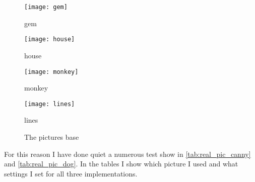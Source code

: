 \begin{figure}[H]
\centering
\begin{minipage}[t]{.49\textwidth}
\centering
\texttt{[image: gem]}
\addtocounter{figure}{-1}
\captionsetup{labelformat=empty}
\caption[]{gem}
\end{minipage}
\begin{minipage}[t]{.49\textwidth}
\centering
\texttt{[image: house]}
\addtocounter{figure}{-1}
\captionsetup{labelformat=empty}
\caption[]{house}
\end{minipage}
\begin{minipage}[t]{.49\textwidth}
\centering
\texttt{[image: monkey]}
\addtocounter{figure}{-1}
\captionsetup{labelformat=empty}
\caption[]{monkey}
\end{minipage}
\begin{minipage}[t]{.49\textwidth}
\centering
\texttt{[image: lines]}
\addtocounter{figure}{-1}
\captionsetup{labelformat=empty}
\caption[]{lines}
\end{minipage}
\caption{The pictures base}
\label{fig:pictures}
\end{figure}

 For this reason I have done quiet a numerous test show in \autoref{tab:real_pic_canny} and \autoref{tab:real_pic_dog}. In the tables I show which picture I used and what settings I set for all three implementations.

\begin{table}[H]
\centering
{}
\caption{Test plans for the Real picture tester for \ac{Canny} algorithm}
\label{tab:real_pic_canny}
\end{table}

\begin{table}[H]
\centering
{}
\caption{Test plans for the Real picture tester for \ac{DoG} algorithm}
\label{tab:real_pic_dog}
\end{table}


